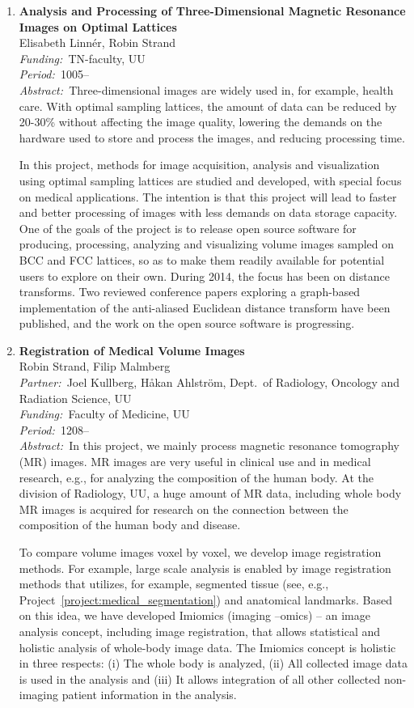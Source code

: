 \documentclass[10pt, a4paper]{article}
\newcommand{\aabstract}[1]{\emph{Abstract:~}#1}
\newcommand{\ffunding}[1]{\emph{Funding:~}#1\\}
\newcommand{\ppartner}[1]{\emph{Partner:~}#1\\}
\newcommand{\pperiod}[1]{\emph{Period:~}#1\\}
\begin{document}
\begin{enumerate}
\newpage
\item 
\label{proj:MRI_optimal_lattices}
\textbf{Analysis and Processing of Three-Dimensional Magnetic Resonance Images on Optimal Lattices} \\
Elisabeth Linn\'{e}r, Robin Strand\\
\ffunding{TN-faculty, UU}
\pperiod{1005--}
\aabstract{Three-dimensional images are widely used in, for example, health care. With optimal sampling lattices, the amount of data can be reduced by 20-30\% without affecting the image quality, lowering the demands on the hardware used to store and process the images, and reducing processing time.

In this project, methods for image acquisition, analysis and visualization using optimal sampling lattices are studied and developed, with special focus on medical applications. The intention is that this project will lead to faster and better processing of images with less demands on data storage capacity. One of the goals of the project is to release open source software for producing, processing, analyzing and visualizing volume images sampled on BCC and FCC lattices, so as to make them readily available for potential users to explore on their own.
During 2014, the focus has been on distance transforms. Two reviewed conference papers exploring a graph-based implementation of the anti-aliased Euclidean distance transform have been published, and the work on the open source software is progressing.}


\item 
\label{proj:MRI_registration}
\textbf{Registration of Medical Volume Images}\\
Robin Strand, Filip Malmberg\\
\ppartner{Joel Kullberg, H{\aa}kan Ahlstr\"{o}m, Dept.~of Radiology, Oncology and Radiation Science, UU}
\ffunding{Faculty of Medicine, UU}
\pperiod{1208--}
\aabstract{In this project, we mainly process magnetic resonance tomography (MR) images. MR images are very useful in clinical use and in medical research, e.g., for analyzing the composition of the human body. At the division of Radiology, UU, a huge amount of MR data, including whole body MR images is acquired for research on the connection between the composition of the human body and disease.

To compare volume images voxel by voxel, we develop image registration methods. For example, large scale analysis is enabled by image registration methods that utilizes, for example, segmented tissue (see, e.g., Project~\ref{project:medical_segmentation}) and anatomical landmarks. Based on this idea, we have developed Imiomics (imaging –omics) -- an image analysis concept, including image registration, that allows statistical and holistic analysis of whole-body image data. The Imiomics concept is holistic in three respects: (i) The whole body is analyzed, (ii) All collected image data is used in the analysis and (iii) It allows integration of all other collected non-imaging patient information in the analysis.}


\end{enumerate}
\end{document}
